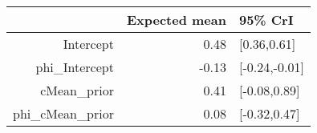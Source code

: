 \begin{tabular}{rrl}
  \hline
 & Expected mean & 95\% CrI \\ 
  \hline
Intercept & 0.48 & [0.36,0.61] \\ 
  phi\_Intercept & -0.13 & [-0.24,-0.01] \\ 
  cMean\_prior & 0.41 & [-0.08,0.89] \\ 
  phi\_cMean\_prior & 0.08 & [-0.32,0.47] \\ 
   \hline
\end{tabular}

